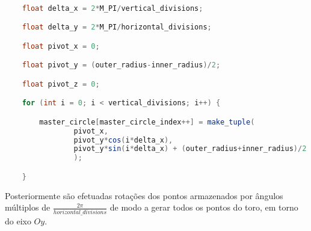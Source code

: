 \documentclass[14pt, a4 paper]{report}
\begin{document}
\begin{lstlisting}[language = Java]

    float delta_x = 2*M_PI/vertical_divisions;

    float delta_y = 2*M_PI/horizontal_divisions;

    float pivot_x = 0;

    float pivot_y = (outer_radius-inner_radius)/2;

    float pivot_z = 0;

    for (int i = 0; i < vertical_divisions; i++) {

        master_circle[master_circle_index++] = make_tuple(
                pivot_x,
                pivot_y*cos(i*delta_x),
                pivot_y*sin(i*delta_x) + (outer_radius+inner_radius)/2
                );

    }
\end{lstlisting}
Posteriormente são efetuadas rotações dos pontos armazenados por ângulos múltiplos de $\frac{2\pi}{horizontal\_divisions}$ de modo a gerar todos os pontos do toro, em torno do eixo $Oy$.
\end{document}
